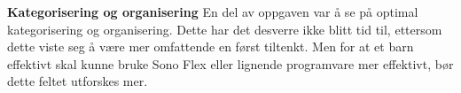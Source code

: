 \textbf{Kategorisering og organisering}
En del av oppgaven var å se på optimal kategorisering og organisering. Dette har det desverre ikke blitt tid til, ettersom dette viste seg å være mer omfattende en først tiltenkt. Men for at et barn effektivt skal kunne bruke Sono Flex eller lignende programvare mer effektivt, bør dette feltet utforskes mer.



































































